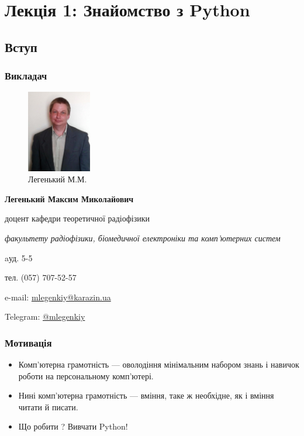 \section*{Лекція 1: Знайомство з Python}
 
\subsection{Вступ}
\begin{frame}
\frametitle{Викладач}
\begin{figure}
\includegraphics[width=0.25\textwidth]{pictures/myphoto}
\caption{Легенький М.М.}
\label{myphoto}
\end{figure}
\textbf{Легенький Максим Миколайович}

доцент кафедри теоретичної радіофізики

\textit{факультету радіофізики, біомедичної електроніки та комп’ютерних систем}

aуд. 5-5

тел. (057) 707-52-57

e-mail: \href{mailto:mlegenkiy@karazin.ua}{mlegenkiy@karazin.ua}

Telegram: \href{https://t.me/mlegenkiy}{@mlegenkiy}
\end{frame}

\begin{frame}
\frametitle{Мотивація}
\begin{itemize}
   \item Комп'ютерна грамотність — оволодіння мінімальним набором знань і навичок роботи на персональному комп'ютері. 
  \item Нині комп'ютерна грамотність —  вміння, таке ж необхідне, як і вміння читати й писати. 
   \item Що робити ? Вивчати Python!
\end{itemize}
\end{frame}

